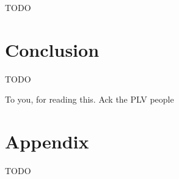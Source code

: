 \documentclass[sigplan,screen,review,anonymous]{acmart}
\begin{document}
TODO


\section{Conclusion}

TODO

\begin{acks}
To you, for reading this.
Ack the PLV people
\end{acks}




\appendix

\section{Appendix}

TODO
\end{document}
